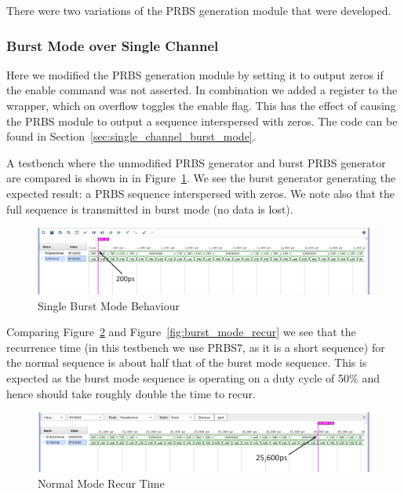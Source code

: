 \noindent There were two variations of the PRBS generation module that were developed.

\subsubsection{Burst Mode over Single Channel}%
\label{ssub:burst_mode_over_single_channel}
Here we modified the PRBS generation module by setting it to output zeros if the
enable command was not asserted.  In combination we added a register
to the wrapper, which on overflow toggles the enable flag. This has the
effect of causing the PRBS module to output a sequence interspersed with zeros.
The code can be found in Section~\ref{sec:single_channel_burst_mode}.

A testbench where the unmodified PRBS generator and burst PRBS generator
are compared is shown in in Figure~\ref{fig:burst_mode_start}.  We see the
burst generator generating the expected result: a PRBS sequence interspersed
with zeros. We note also that the full sequence is transmitted in burst mode (no
data is lost).

\begin{figure}[ht]
    \centering
    \hspace*{-3cm}\includegraphics[width=1.4\linewidth]{img/burst_mode_1.png}
    \caption{Single Burst Mode Behaviour}%
    \label{fig:burst_mode_start}
\end{figure}

Comparing Figure~\ref{fig:normal_mode_recur} and
Figure~\ref{fig:burst_mode_recur} we see that the recurrence time (in this
testbench we use PRBS7, as it is a short sequence) for the normal sequence is
about half that of the burst mode sequence. This is expected as the burst mode
sequence is operating on a duty cycle of 50\% and hence should take roughly double the
time to recur.

\begin{figure}[ht]
    \centering
    \hspace*{-3cm}\includegraphics[width=1.4\linewidth]{img/burst_mode_2.png}
    \caption{Normal Mode Recur Time}%
    \label{fig:normal_mode_recur}
\end{figure}

